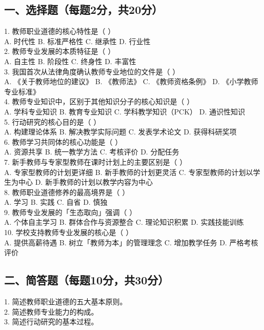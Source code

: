 \documentclass[12pt,a4paper]{article}
\begin{document}
\subsection{一、选择题（每题2分，共20分）}
1. 教师职业道德的核心特性是（ ）\\
A. 时代性 B. 标准严格性 C. 继承性 D. 行业性\\
2. 教师专业发展的本质特征是（ ）\\
A. 自主性 B. 阶段性 C. 终身性 D. 丰富性\\
3. 我国首次从法律角度确认教师专业地位的文件是（ ）\\
A. 《关于教师地位的建议》 B. 《教师法》 C. 《教师资格条例》 D. 《小学教师专业标准》\\
4. 教师专业知识中，区别于其他知识分子的核心知识是（ ）\\
A. 学科专业知识 B. 教育专业知识 C. 学科教学知识（PCK） D. 通识性知识\\
5. 行动研究的核心目的是（ ）\\
A. 构建理论体系 B. 解决教学实际问题 C. 发表学术论文 D. 获得科研奖项\\
6. 教师学习共同体的核心功能是（ ）\\
A. 资源共享 B. 统一教学方法 C. 考核评价 D. 分配任务\\
7. 新手教师与专家型教师在课时计划上的主要区别是（ ）\\
A. 专家型教师的计划更详细 B. 新手教师的计划更灵活 C. 专家型教师的计划以学生为中心 D. 新手教师的计划以教学内容为中心\\
8. 教师职业道德修养的最高境界是（ ）\\
A. 学习 B. 实践 C. 自省 D. 慎独\\
9. 教师专业发展的「生态取向」强调（ ）\\
A. 个体自主学习 B. 群体合作与资源整合 C. 理论知识积累 D. 实践技能训练\\
10. 学校支持教师专业发展的核心是（ ）\\
A. 提供高薪待遇 B. 树立「教师为本」的管理理念 C. 增加教学任务 D. 严格考核评价\\

\subsection{二、简答题（每题10分，共30分）}
1. 简述教师职业道德的五大基本原则。\\
2. 简述教师专业能力的构成。\\
3. 简述行动研究的基本过程。\\
\end{document}
